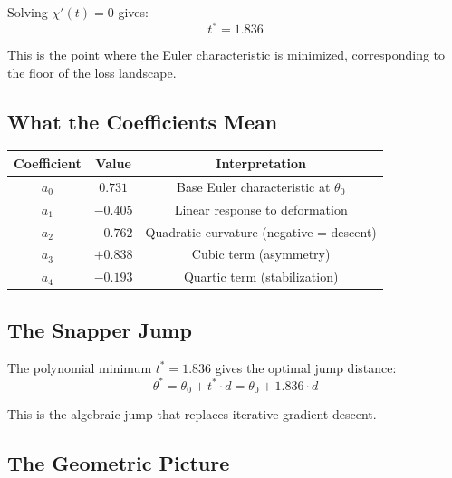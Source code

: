 \documentclass[11pt]{amsart}
\begin{document}
Solving $\chi'(t) = 0$ gives:
\[
t^* = 1.836
\]

This is the point where the Euler characteristic is minimized, corresponding to the floor of the loss landscape.

\subsection{What the Coefficients Mean}

\begin{table}[h!]
\centering
\begin{tabular}{c|c|c}
\textbf{Coefficient} & \textbf{Value} & \textbf{Interpretation} \\
\hline
$a_0$ & $0.731$ & Base Euler characteristic at $\theta_0$ \\
$a_1$ & $-0.405$ & Linear response to deformation \\
$a_2$ & $-0.762$ & Quadratic curvature (negative = descent) \\
$a_3$ & $+0.838$ & Cubic term (asymmetry) \\
$a_4$ & $-0.193$ & Quartic term (stabilization)
\end{tabular}
\end{table}

\subsection{The Snapper Jump}

The polynomial minimum $t^* = 1.836$ gives the optimal jump distance:
\[
\theta^* = \theta_0 + t^* \cdot d = \theta_0 + 1.836 \cdot d
\]

This is the algebraic jump that replaces iterative gradient descent.

\subsection{The Geometric Picture}

\begin{figure}[H]
    \centering
{}
\end{figure}
\end{document}

